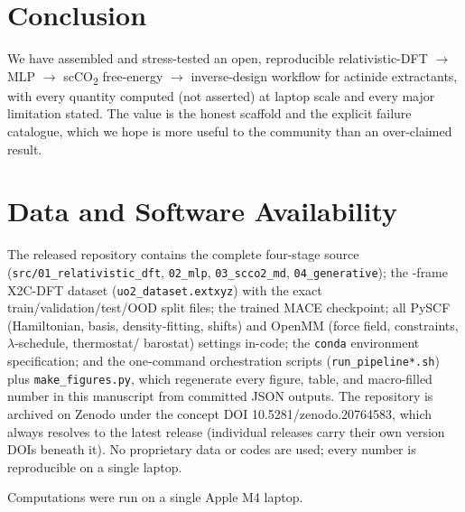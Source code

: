 \documentclass[journal=jcisd8,manuscript=article]{achemso}
\begin{document}
\section{Conclusion}
We have assembled and stress-tested an open, reproducible relativistic-DFT \(\rightarrow\)
MLP \(\rightarrow\) scCO\textsubscript{2} free-energy \(\rightarrow\) inverse-design
workflow for actinide extractants, with every quantity computed (not asserted) at
laptop scale and every major limitation stated. The value is the honest scaffold
and the explicit failure catalogue, which we hope is more useful to the community
than an over-claimed result.

\section*{Data and Software Availability}
The released repository contains the complete four-stage source
(\texttt{src/01\_relativistic\_dft}, \texttt{02\_mlp}, \texttt{03\_scco2\_md},
\texttt{04\_generative}); the \mlpNframes-frame X2C-DFT dataset
(\texttt{uo2\_dataset.extxyz}) with the exact train/validation/test/OOD split files;
the trained MACE checkpoint; all PySCF (Hamiltonian, basis, density-fitting,
shifts) and OpenMM (force field, constraints, $\lambda$-schedule, thermostat/
barostat) settings in-code; the \texttt{conda} environment specification; and the
one-command orchestration scripts (\texttt{run\_pipeline*.sh}) plus
\texttt{make\_figures.py}, which regenerate every figure, table, and macro-filled
number in this manuscript from committed JSON outputs. The repository is archived on
Zenodo under the concept DOI 10.5281/zenodo.20764583, which always resolves to the
latest release (individual releases carry their own version DOIs beneath it). No
proprietary data or codes are used; every number is reproducible on a single laptop.

\begin{acknowledgement}
Computations were run on a single Apple M4 laptop.
\end{acknowledgement}


\end{document}
